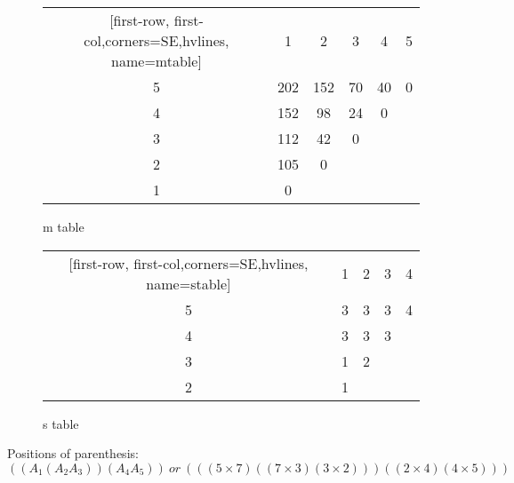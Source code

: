 \documentclass[a4paper]{article}
\makeatletter
\newenvironment{solution}
  {\begin{proof}[Solution]}
  {\end{proof}}
\renewenvironment{proof}[1][\proofname]{%
  \par\pushQED{\qed}\normalfont%
  \topsep6\p@\@plus6\p@\relax
  \trivlist\item[\hskip\labelsep\bfseries#1\@addpunct{.}]%
  \ignorespaces
}{%
  \popQED\endtrivlist\@endpefalse
}
\makeatother
\begin{document}
\begin{figure}[H]
\centering
\begin{minipage}{5cm}
\centering
{}
\begin{NiceTabular}{*{5}{c}}[first-row, first-col,corners=SE,hvlines, name=mtable]
&1&2&3&4&5\\
5&202&152&70&40&0\\
4&152&98&24&0\\
3&112&42&0\\
2&105&0\\
1&0
\end{NiceTabular}
\caption{m table}
\end{minipage}
\qquad
\begin{minipage}{5cm}
\centering
{}
\begin{NiceTabular}{*{4}{c}}[first-row, first-col,corners=SE,hvlines, name=stable]
&1&2&3&4\\
5&3&3&3&4\\
4&3&3&3\\
3&1&2\\
2&1\\
\end{NiceTabular}
\caption{s table}
\end{minipage}
\end{figure}

\begin{solution}
Positions of parenthesis: $((A_1(A_2A_3))(A_4A_5))\ or\ (((5 \times 7)((7 \times 3)(3 \times 2)))((2 \times 4)(4 \times 5)))$
\end{solution}
\end{document}
